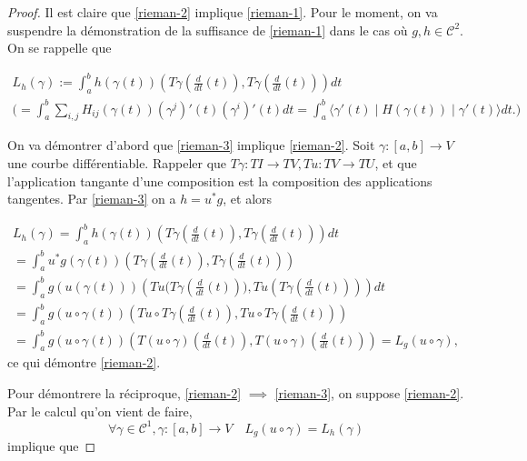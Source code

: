 \documentclass[french]{article}
\theoremstyle{definition}
\begin{document}
\begin{proof}
  Il est claire que \ref{rieman-2} implique \ref{rieman-1}. Pour le moment, on va suspendre la démonstration de la suffisance de \ref{rieman-1} dans le cas o\`u $g, h\in \mathcal{C}^2$.  On  se rappelle que

  \begin{gather*}
    L_h(\gamma) := \int_{a}^{b} h(\gamma(t))(T \gamma \left(\frac{d}{dt}(t)\right), T \gamma \left(\frac{d}{dt}(t)\right))dt \\
\Big (    = \int_{a}^{b} \sum_{i,j}^{} H _{ij}(\gamma(t))(\gamma ^{j})'(t) (\gamma ^{i})'(t)dt = \int_{a}^{b} \langle \gamma'(t) \mid H (\gamma(t)) \mid \gamma'(t) \rangle dt. \Big )
  \end{gather*}


On va démontrer d'abord que \ref{rieman-3} implique \ref{rieman-2}. Soit $\gamma :[a,b] \to V$ une courbe diff\'erentiable.  Rappeler que \(T \gamma : T I \longrightarrow T V, T u : T V \longrightarrow T U\), et  que l'application tangante d'une composition est la composition des applications tangentes.  Par \ref{rieman-3}  on a  \(h = u ^{*}g\),   et alors

  \begin{gather*}
    L_h(\gamma) = \int_{a}^{b} h(\gamma(t)) \left(T \gamma \left(\frac{d}{dt}(t)\right), T \gamma \left(\frac{d}{dt}(t)\right)\right) dt \\
    = \int_{a}^{b} u ^{*}g(\gamma(t))\left(T \gamma \left(\frac{d}{dt}(t)\right), T \gamma \left(\frac{d}{dt}(t)\right)\right) \\
    = \int_{a}^{b} g(u(\gamma(t))) (T u \Big (T \gamma \left(\frac{d}{dt}(t)\right)  \Big ), T u \left(T \gamma \left(\frac{d}{dt}(t)\right)\right))  dt\\
    = \int_{a}^{b} g (u \circ \gamma(t)) \left(T u \circ T \gamma \left(\frac{d}{dt}(t)\right), T u \circ T \gamma \left(\frac{d}{dt}(t)\right)\right)  \\
    = \int_{a}^{b} g(u \circ \gamma(t)) \left(T (u \circ \gamma) \left(\frac{d}{dt}(t)\right), T(u \circ \gamma)\left(\frac{d}{dt}(t)\right)\right)  = L_g(u \circ \gamma),
  \end{gather*} ce qui d\'emontre \ref{rieman-2}.




  Pour d\'emontrere la r\'eciproque, \ref{rieman-2} $\implies$ \ref{rieman-3}, on suppose \ref{rieman-2}.  Par le calcul qu'on vient de faire,
  \[\forall \gamma \in \mathcal{C}^1, \gamma : [a,b] \longrightarrow V \quad L_g (u \circ \gamma) = L_h(\gamma)\] implique que


\end{proof}
\end{document}
